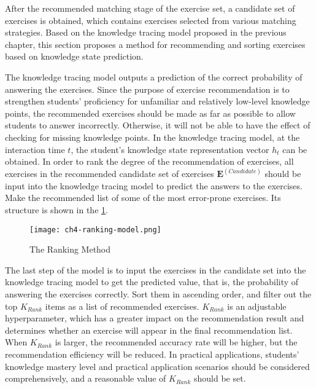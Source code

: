 After the recommended matching stage of the exercise set, a candidate set of exercises is obtained, which contains exercises selected from various matching strategies. Based on the knowledge tracing model proposed in the previous chapter, this section proposes a method for recommending and sorting exercises based on knowledge state prediction.

The knowledge tracing model outputs a prediction of the correct probability of answering the exercises. Since the purpose of exercise recommendation is to strengthen students' proficiency for unfamiliar and relatively low-level knowledge points, the recommended exercises should be made as far as possible to allow students to answer incorrectly. Otherwise, it will not be able to have the effect of checking for missing knowledge points. In the knowledge tracing model, at the interaction time \(t\), the student's knowledge state representation vector \(h_t\) can be obtained. In order to rank the degree of the recommendation of exercises, all exercises in the recommended candidate set of exercises \(\mathbf{E}^{(Candidate)}\) should be input into the knowledge tracing model to predict the answers to the exercises. Make the recommended list of some of the most error-prone exercises. Its structure is shown in the \figurename{\ref{fig:ch4-ranking-1}}.

\begin{figure}[h]
  \centering
  \texttt{[image: ch4-ranking-model.png]}
  \caption{The Ranking Method}\label{fig:ch4-ranking-1}
\end{figure}


The last step of the model is to input the exercises in the candidate set into the knowledge tracing model to get the predicted value, that is, the probability of answering the exercises correctly. Sort them in ascending order, and filter out the top \(K_{Rank}\) items as a list of recommended exercises. \(K_{Rank}\) is an adjustable hyperparameter, which has a greater impact on the recommendation result and determines whether an exercise will appear in the final recommendation list. When \(K_{Rank}\) is larger, the recommended accuracy rate will be higher, but the recommendation efficiency will be reduced. In practical applications, students' knowledge mastery level and practical application scenarios should be considered comprehensively, and a reasonable value of \(K_{Rank}\) should be set.

